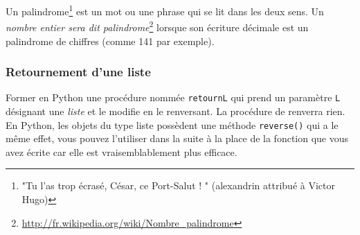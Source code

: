 Un palindrome\footnote{ "Tu l'as trop écrasé, César, ce Port-Salut ! " (alexandrin attribué à Victor Hugo)} est un mot ou une phrase qui se lit dans les deux sens. Un \emph{nombre entier sera dit palindrome}\footnote{\href{http://fr.wikipedia.org/wiki/Nombre\_palindrome}{http://fr.wikipedia.org/wiki/Nombre\_palindrome}} lorsque son écriture décimale est un palindrome de chiffres (comme 141 par exemple).

\subsubsection{Retournement d'une liste}
Former en Python une procédure nommée \verb|retournL| qui prend un paramètre \verb|L| désignant une \emph{liste} et le modifie en le renversant. La procédure de renverra rien.\newline
En Python, les objets du type liste possèdent une méthode \verb|reverse()| qui a le même effet, vous pouvez l'utiliser dans la suite à la place de la fonction que vous avez écrite car elle est vraisemblablement plus efficace.

